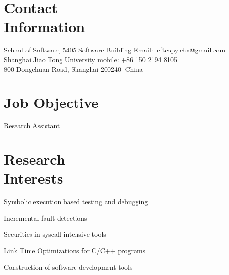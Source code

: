 \documentclass[margin, line, 11pt]{resume}
\begin{document}
\begin{resume}

    \section{\mysidestyle Contact\\Information}

    School of Software, 5405 Software Building                            \hfill Email: leftcopy.chx@gmail.com          \vspace{0mm}\\\vspace{0mm}%
    Shanghai Jiao Tong University                          \hfill mobile:\hspace{20pt} +86 150 2194 8105          \vspace{0mm}\\\vspace{0mm}%
    800 Dongchuan Road, Shanghai 200240, China
    \vspace{0mm}\\\vspace{-4.5mm}%

    \section{\mysidestyle Job Objective}
    Research Assistant
    \section{\mysidestyle Research\\Interests}

    \begin{list2}
    \item Symbolic execution based testing and debugging
    \item Incremental fault detections
    \item Securities in syscall-intensive tools
    \item Link Time Optimizations for C/C++ programs
    \item Construction of software development tools
    \end{list2}



\end{resume}
\end{document}
